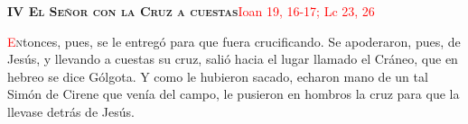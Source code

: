 \noindent\textbf{\textsc{IV El Señor con la Cruz a cuestas}}\hfill\textcolor{red}{Ioan 19, 16-17; Lc 23, 26}

\vspace{0.25em}

\lettrine[lines=2]{\textcolor{red}{E}}ntonces, pues, se le entregó para que fuera crucificando. Se apoderaron, pues, de Jesús, y llevando a cuestas su cruz, 
salió hacia el lugar llamado el Cráneo, que en hebreo se dice Gólgota. Y como le hubieron sacado, echaron mano de un tal Simón de Cirene que venía del campo, 
le pusieron en hombros la cruz para que la llevase detrás de Jesús.
